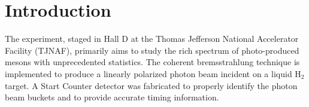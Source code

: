 \section{Introduction}

The \gx{} experiment, staged in Hall D at the Thomas Jefferson National Accelerator Facility (TJNAF), primarily aims to study the rich spectrum of photo-produced mesons with unprecedented statistics.  The coherent bremsstrahlung technique is implemented to produce a linearly polarized photon beam incident on a liquid $\mathrm{H_{2}}$ target. A Start Counter detector was fabricated to properly identify the photon beam buckets and to provide accurate timing information.